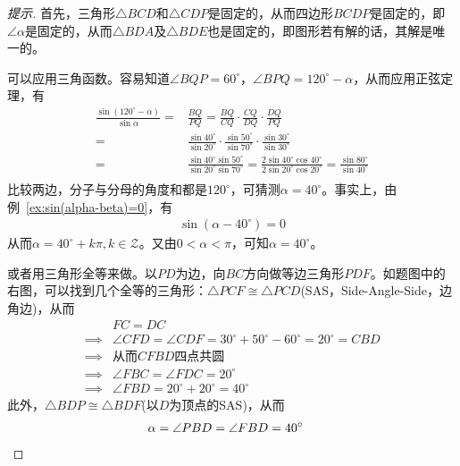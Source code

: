 \begin{proof}[提示]
  首先，三角形$\triangle BCD$和$\triangle CDP$是固定的，从而四边形$BCDP$是固定的，即$\angle\alpha$是固定的，从而$\triangle BDA$及$\triangle BDE$也是固定的，即图形若有解的话，其解是唯一的。

  可以应用三角函数。容易知道$\angle BQP = 60^\circ$，$\angle BPQ = 120^\circ - \alpha$，从而应用正弦定理，有
  \begin{align*}
    \frac{\sin (120^\circ - \alpha)}{\sin\alpha} ={} &\frac{BQ}{PQ} = \frac{BQ}{CQ}\cdot\frac{CQ}{DQ}\cdot\frac{DQ}{PQ}\\
    ={}& \frac{\sin40^\circ}{\sin20^\circ}\cdot \frac{\sin50^\circ}{\sin70^\circ}\cdot \frac{\sin30^\circ}{\sin30^\circ}\\
    ={}& \frac{\sin40^\circ \sin50^\circ}{\sin20^\circ\sin70^\circ} = \frac{2\sin40^\circ \cos40^\circ}{2\sin20^\circ\cos20^\circ} = \frac{\sin80^\circ }{\sin40^\circ} \\
  \end{align*}
  比较两边，分子与分母的角度和都是$120^\circ$，可猜测$\alpha = 40^\circ$。事实上，由例~\ref{ex:sin(alpha-beta)=0}，有
  \begin{align*}
    \sin(\alpha - 40^\circ) = 0
  \end{align*}
  从而$\alpha = 40^\circ + k\pi, k\in\mathcal{Z}$。又由$0 < \alpha < \pi$，可知$\alpha = 40^\circ$。

  或者用三角形全等来做。以$PD$为边，向$BC$方向做等边三角形$PDF$。如题图中的右图，可以找到几个全等的三角形：$\triangle PCF \cong \triangle PCD$(SAS，Side-Angle-Side，边角边)，从而
  \begin{align*}
    &FC=DC\\
    \implies & \angle CFD = \angle CDF = 30^\circ + 50^\circ - 60^\circ = 20^\circ = CBD\\
    \implies & \text{从而$CFBD$四点共圆}\\
    \implies & \angle FBC = \angle FDC = 20^\circ\\
    \implies & \angle FBD = 20^\circ + 20^\circ = 40^\circ    
  \end{align*}
  此外，$\triangle BDP \cong \triangle BDF$(以$D$为顶点的SAS)，从而
  \begin{align*}
    \alpha = \angle PBD = \angle FBD = 40^\circ &\qedhere
  \end{align*}
\end{proof}

